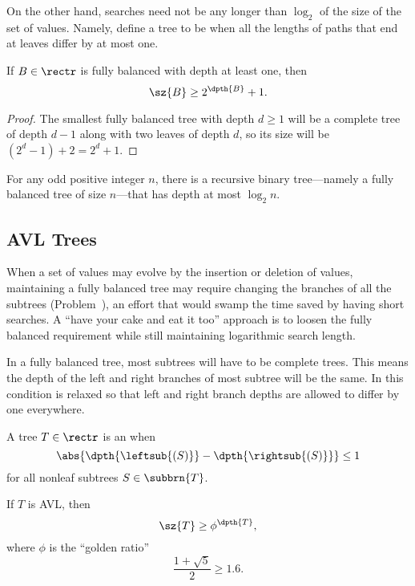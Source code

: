 \begin{definition}
On the other hand, searches need not be any longer than $\log_2$ of the
size of the set of values.  Namely, define a tree to be  when all the lengths of paths that end at leaves differ by
at most one.

\begin{theorem}\label{b>2d}
If $B \in \rectr$ is fully balanced with depth at least one, then
\[
\sz{B} \geq 2^{\dpth{B}} + 1.
\]

\begin{proof}
The smallest fully balanced tree with depth $d \geq 1$ will be a complete
tree of depth $d-1$ along with two leaves of depth $d$, so its size
will be $(2^d-1) + 2 = 2^d+1$.
\end{proof}
\end{theorem}

\begin{corollary}
For any odd positive integer $n$, there is a recursive binary
tree---namely a fully balanced tree of size $n$---that has depth at
most $\log_2 n$.
\end{corollary}

\subsection{AVL Trees}

When a set of values may evolve by the insertion or deletion of
values, maintaining a fully balanced tree may require changing the
branches of all the subtrees (Problem~), an
effort that would swamp the time saved by having short searches.  A
``have your cake and eat it too'' approach is to loosen the fully
balanced requirement while still maintaining logarithmic search
length.

In a fully balanced tree, most subtrees will have to be complete
trees.  This means the depth of the left and right branches of most
subtree will be the same.  In  this condition is
relaxed so that left and right branch depths are allowed to differ
by one everywhere.

\begin{definition}
A tree $T\in \rectr$ is an  when
\[
\abs{\dpth{\leftsub{(S)}} - \dpth{\rightsub{(S)}}} \leq 1
\]
for all nonleaf subtrees $S \in \subbrn{T}$.
\end{definition}


\begin{lemma}\label{avl_size}
If $T$ is AVL, then
\begin{equation}\label{sizeTphidT}
\sz{T} \geq \phi^{\dpth{T}}, 
\end{equation}
where $\phi$ is the ``golden ratio''
\[
\frac{1+\sqrt{5}}{2} \geq 1.6.
\]


\end{lemma}
\end{definition}
